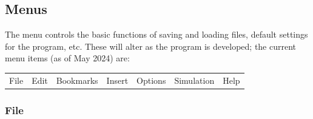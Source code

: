\subsection{Menus}

\label{Menu}

The menu controls the basic functions of saving and loading files,
default settings for the program, etc. These will alter as the program
is developed; the current menu items (as of May 2024) are:

\begin{tabular}{lllllll}
File  & Edit  & Bookmarks  & Insert  & Options  & Simulation  & Help \tabularnewline
\end{tabular}

\subsubsection{File}

